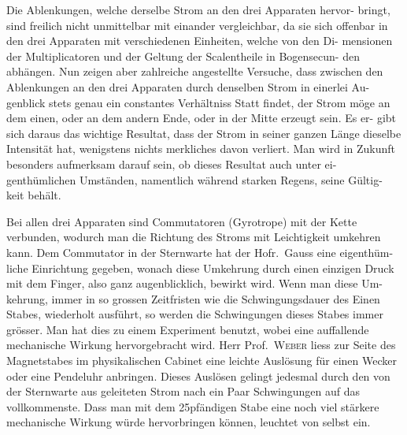 \documentclass[12pt,a4paper]{article}
\begin{document}
Die Ablenkungen, welche derselbe Strom an den drei Apparaten hervor-
bringt, sind freilich nicht unmittelbar mit einander vergleichbar, da sie sich 
offenbar in den drei Apparaten mit verschiedenen Einheiten, welche von den Di-
mensionen der Multiplicatoren und der Geltung der Scalentheile in Bogensecun-
den abhängen. Nun zeigen aber zahlreiche angestellte Versuche, dass zwischen 
den Ablenkungen an den drei Apparaten durch denselben Strom in einerlei Au-
genblick stets genau ein constantes Verhältniss Statt findet, der Strom möge an 
dem einen, oder an dem andern Ende, oder in der Mitte erzeugt sein. Es er-
gibt sich daraus das wichtige Resultat, dass der Strom in seiner ganzen Länge 
dieselbe Intensität hat, wenigstens nichts merkliches davon verliert. Man wird 
in Zukunft besonders aufmerksam darauf sein, ob dieses Resultat auch unter ei-
genthümlichen Umständen, namentlich während starken Regens, seine Gültig-
keit behält.

Bei allen drei Apparaten sind Commutatoren (Gyrotrope) mit der Kette 
verbunden, wodurch man die Richtung des Stroms mit Leichtigkeit umkehren 
kann. Dem Commutator in der Sternwarte hat der Hofr.\ Gauss eine eigenthüm-
liche Einrichtung gegeben, wonach diese Umkehrung durch einen einzigen Druck 
mit dem Finger, also ganz augenblicklich, bewirkt wird. Wenn man diese Um-
kehrung, immer in so grossen Zeitfristen wie die Schwingungsdauer des Einen 
Stabes, wiederholt ausführt, so werden die Schwingungen dieses Stabes immer 
grösser. Man hat dies zu einem Experiment benutzt, wobei eine auffallende 
mechanische Wirkung hervorgebracht wird. Herr Prof.\ \textsc{Weber} liess zur Seite 
des Magnetstabes im physikalischen Cabinet eine leichte Auslösung für einen 
Wecker oder eine Pendeluhr anbringen. Dieses Auslösen gelingt jedesmal durch 
den von der Sternwarte aus geleiteten Strom nach ein Paar Schwingungen auf das 
vollkommenste. Dass man mit dem 25pfändigen Stabe eine noch viel stärkere 
mechanische Wirkung würde hervorbringen können, leuchtet von selbst ein.
\end{document}
